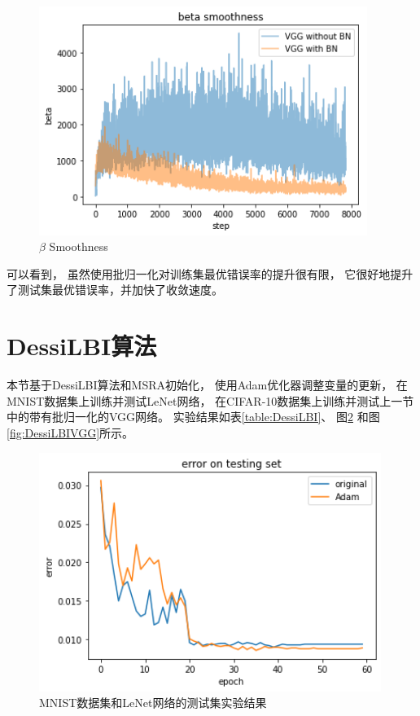 \documentclass{article}
\begin{document}
\begin{figure}[p]
\centering
\includegraphics[width=0.95\textwidth]
{Result/Beta Smoothness.png}
\caption{$\beta$ Smoothness}
\label{fig:VGGBS}
\end{figure}

可以看到，
虽然使用批归一化对训练集最优错误率的提升很有限，
它很好地提升了测试集最优错误率，并加快了收敛速度。

\section{DessiLBI算法}

本节基于DessiLBI算法和MSRA初始化，
使用Adam优化器调整变量的更新，
在MNIST数据集上训练并测试LeNet网络，
在CIFAR-10数据集上训练并测试上一节中的带有批归一化的VGG网络。
实验结果如表\ref{table:DessiLBI}、
图\ref{fig:DessiLBILeNet}
和图\ref{fig:DessiLBIVGG}所示。

\begin{figure}[p]
\centering
\includegraphics[width=0.99\textwidth]
{Result/DessiLBI LeNet original/figure.png}
\caption{MNIST数据集和LeNet网络的测试集实验结果}
\label{fig:DessiLBILeNet}
\end{figure}
\end{document}
